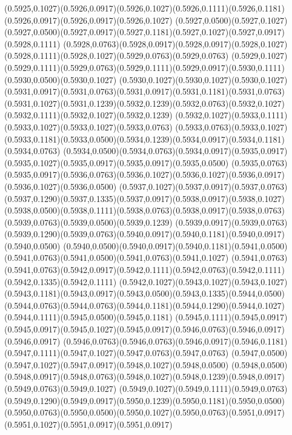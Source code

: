 (0.5925,0.1027)(0.5926,0.0917)(0.5926,0.1027)(0.5926,0.1111)(0.5926,0.1181)(0.5926,0.0917)(0.5926,0.0917)(0.5926,0.1027)
(0.5927,0.0500)(0.5927,0.1027)(0.5927,0.0500)(0.5927,0.0917)(0.5927,0.1181)(0.5927,0.1027)(0.5927,0.0917)(0.5928,0.1111)
(0.5928,0.0763)(0.5928,0.0917)(0.5928,0.0917)(0.5928,0.1027)(0.5928,0.1111)(0.5928,0.1027)(0.5929,0.0763)(0.5929,0.0763)
(0.5929,0.1027)(0.5929,0.1111)(0.5929,0.0763)(0.5929,0.1111)(0.5929,0.0917)(0.5930,0.1111)(0.5930,0.0500)(0.5930,0.1027)
(0.5930,0.1027)(0.5930,0.1027)(0.5930,0.1027)(0.5931,0.0917)(0.5931,0.0763)(0.5931,0.0917)(0.5931,0.1181)(0.5931,0.0763)
(0.5931,0.1027)(0.5931,0.1239)(0.5932,0.1239)(0.5932,0.0763)(0.5932,0.1027)(0.5932,0.1111)(0.5932,0.1027)(0.5932,0.1239)
(0.5932,0.1027)(0.5933,0.1111)(0.5933,0.1027)(0.5933,0.1027)(0.5933,0.0763)
\PST@Solid(0.5933,0.0763)(0.5933,0.1027)(0.5933,0.1181)(0.5933,0.0500)(0.5934,0.1239)(0.5934,0.0917)(0.5934,0.1181)(0.5934,0.0763)
(0.5934,0.0500)(0.5934,0.0763)(0.5934,0.0917)(0.5935,0.0917)(0.5935,0.1027)(0.5935,0.0917)(0.5935,0.0917)(0.5935,0.0500)
(0.5935,0.0763)(0.5935,0.0917)(0.5936,0.0763)(0.5936,0.1027)(0.5936,0.1027)(0.5936,0.0917)(0.5936,0.1027)(0.5936,0.0500)
(0.5937,0.1027)(0.5937,0.0917)(0.5937,0.0763)(0.5937,0.1290)(0.5937,0.1335)(0.5937,0.0917)(0.5938,0.0917)(0.5938,0.1027)
(0.5938,0.0500)(0.5938,0.1111)(0.5938,0.0763)(0.5938,0.0917)(0.5938,0.0763)(0.5939,0.0763)(0.5939,0.0500)(0.5939,0.1239)
(0.5939,0.0917)(0.5939,0.0763)(0.5939,0.1290)(0.5939,0.0763)(0.5940,0.0917)(0.5940,0.1181)(0.5940,0.0917)(0.5940,0.0500)
(0.5940,0.0500)(0.5940,0.0917)(0.5940,0.1181)(0.5941,0.0500)(0.5941,0.0763)(0.5941,0.0500)(0.5941,0.0763)(0.5941,0.1027)
(0.5941,0.0763)(0.5941,0.0763)(0.5942,0.0917)(0.5942,0.1111)(0.5942,0.0763)(0.5942,0.1111)(0.5942,0.1335)(0.5942,0.1111)
(0.5942,0.1027)(0.5943,0.1027)(0.5943,0.1027)(0.5943,0.1181)(0.5943,0.0917)(0.5943,0.0500)(0.5943,0.1335)(0.5944,0.0500)
(0.5944,0.0763)(0.5944,0.0763)(0.5944,0.1181)(0.5944,0.1290)(0.5944,0.1027)(0.5944,0.1111)(0.5945,0.0500)(0.5945,0.1181)
(0.5945,0.1111)(0.5945,0.0917)(0.5945,0.0917)(0.5945,0.1027)(0.5945,0.0917)(0.5946,0.0763)(0.5946,0.0917)(0.5946,0.0917)
(0.5946,0.0763)(0.5946,0.0763)(0.5946,0.0917)(0.5946,0.1181)(0.5947,0.1111)(0.5947,0.1027)(0.5947,0.0763)(0.5947,0.0763)
(0.5947,0.0500)(0.5947,0.1027)(0.5947,0.0917)(0.5948,0.1027)(0.5948,0.0500)
\PST@Solid(0.5948,0.0500)(0.5948,0.0917)(0.5948,0.0763)(0.5948,0.1027)(0.5948,0.1239)(0.5948,0.0917)(0.5949,0.0763)(0.5949,0.1027)
(0.5949,0.1027)(0.5949,0.1111)(0.5949,0.0763)(0.5949,0.1290)(0.5949,0.0917)(0.5950,0.1239)(0.5950,0.1181)(0.5950,0.0500)
(0.5950,0.0763)(0.5950,0.0500)(0.5950,0.1027)(0.5950,0.0763)(0.5951,0.0917)(0.5951,0.1027)(0.5951,0.0917)(0.5951,0.0917)

